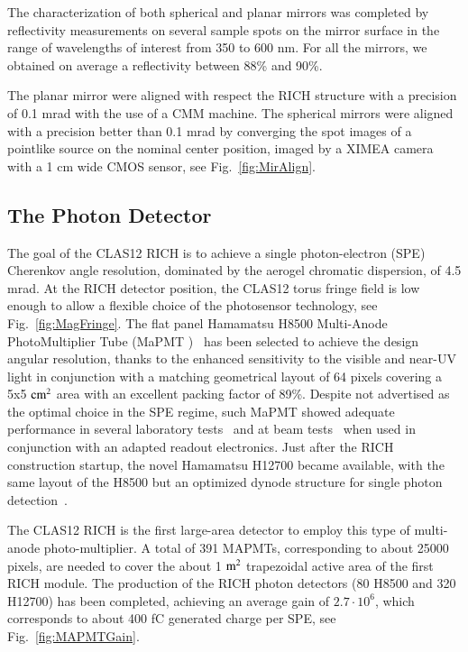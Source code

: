 \documentclass[final,5p,times,twocolumn]{elsarticle}
\def\MAPMT{MaPMT }
\begin{document}
The characterization of both spherical and planar mirrors was completed by reflectivity measurements on several sample spots on the mirror 
surface in the range of wavelengths of interest from 350 to 600 nm. For all the mirrors, we obtained on average a reflectivity between 88\% 
and 90\%.

The planar mirror were aligned with respect the RICH structure with a precision of 0.1 mrad with the use of a CMM machine. The spherical
mirrors were aligned with a precision better than 0.1 mrad by converging the spot images of a pointlike source on the nominal center position, 
imaged by a XIMEA camera with a 1 cm wide CMOS sensor, see Fig.~\ref{fig:MirAlign}.


\subsection{The Photon Detector}
The goal of the CLAS12 RICH is to achieve a single photon-electron (SPE) Cherenkov angle resolution, dominated by the 
aerogel chromatic dispersion, of 4.5 mrad. 
At the RICH detector position, the CLAS12 torus fringe field is low enough to allow a flexible choice of the photosensor
technology, see Fig.~\ref{fig:MagFringe}.
The flat panel Hamamatsu H8500 Multi-Anode PhotoMultiplier Tube (\MAPMT)~\cite{Ref:H8500} has been 
selected to achieve the design angular resolution, thanks to the enhanced sensitivity to the visible and near-UV light in conjunction with a matching geometrical 
layout of 64 pixels covering a 5x5 $\rm cm^2$ area with an excellent packing factor of 89\%.
Despite not advertised as the optimal choice in the SPE regime, such \MAPMT showed adequate performance 
in several laboratory tests~\cite{MAPMT:test} and at beam tests~\cite{RICH:CERN} when used in 
conjunction with an adapted readout electronics. Just after the RICH construction startup, the novel Hamamatsu 
H12700 became available, with the same layout of the H8500 but an optimized dynode structure for single 
photon detection~\cite{Ref:H12700}. 

The CLAS12 RICH is the first large-area detector to employ this type of multi-anode photo-multiplier. A total of 391
MAPMTs, corresponding to about 25000 pixels, are needed to cover the about 1 $\rm m^2$ trapezoidal active 
area of the first RICH module. 
The production of the RICH photon detectors (80 H8500 and 320 H12700) has been completed, achieving an
average gain of $2.7\cdot 10^6$, which corresponds to about 400 fC generated charge per SPE, see Fig.~\ref{fig:MAPMTGain}.
\end{document}
